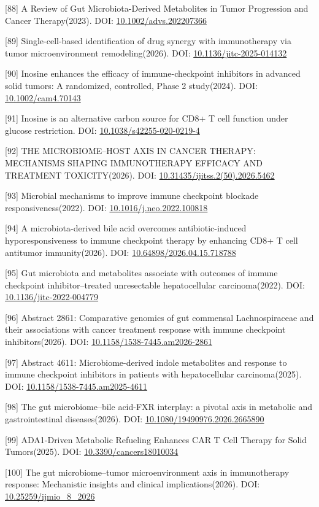 \documentclass[11pt]{article}
\begin{document}
{[}88{]} A Review of Gut Microbiota-Derived Metabolites in Tumor Progression and Cancer Therapy(2023). DOI: \url{10.1002/advs.202207366}

{[}89{]} Single-cell-based identification of drug synergy with immunotherapy via tumor microenvironment remodeling(2026). DOI: \url{10.1136/jitc-2025-014132}

{[}90{]} Inosine enhances the efficacy of immune-checkpoint inhibitors in advanced solid tumors: A randomized, controlled, Phase 2 study(2024). DOI: \url{10.1002/cam4.70143}

{[}91{]} Inosine is an alternative carbon source for CD8+ T cell function under glucose restriction. DOI: \url{10.1038/s42255-020-0219-4}

{[}92{]} THE MICROBIOME--HOST AXIS IN CANCER THERAPY: MECHANISMS SHAPING IMMUNOTHERAPY EFFICACY AND TREATMENT TOXICITY(2026). DOI: \url{10.31435/ijitss.2(50).2026.5462}

{[}93{]} Microbial mechanisms to improve immune checkpoint blockade responsiveness(2022). DOI: \url{10.1016/j.neo.2022.100818}

{[}94{]} A microbiota-derived bile acid overcomes antibiotic-induced hyporesponsiveness to immune checkpoint therapy by enhancing CD8+ T cell antitumor immunity(2026). DOI: \url{10.64898/2026.04.15.718788}

{[}95{]} Gut microbiota and metabolites associate with outcomes of immune checkpoint inhibitor--treated unresectable hepatocellular carcinoma(2022). DOI: \url{10.1136/jitc-2022-004779}

{[}96{]} Abstract 2861: Comparative genomics of gut commensal Lachnospiraceae and their associations with cancer treatment response with immune checkpoint inhibitors(2026). DOI: \url{10.1158/1538-7445.am2026-2861}

{[}97{]} Abstract 4611: Microbiome-derived indole metabolites and response to immune checkpoint inhibitors in patients with hepatocellular carcinoma(2025). DOI: \url{10.1158/1538-7445.am2025-4611}

{[}98{]} The gut microbiome--bile acid-FXR interplay: a pivotal axis in metabolic and gastrointestinal diseases(2026). DOI: \url{10.1080/19490976.2026.2665890}

{[}99{]} ADA1-Driven Metabolic Refueling Enhances CAR T Cell Therapy for Solid Tumors(2025). DOI: \url{10.3390/cancers18010034}

{[}100{]} The gut microbiome--tumor microenvironment axis in immunotherapy response: Mechanistic insights and clinical implications(2026). DOI: \url{10.25259/ijmio_8_2026}
\end{document}
